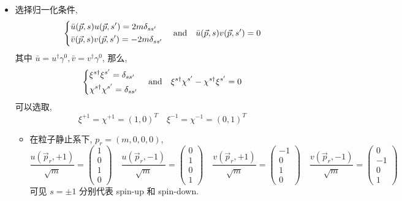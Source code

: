 \begin{itemize}
	\item 选择归一化条件,
	\begin{equation}
		\begin{dcases}
			\bar{u}(\vec{p}, s) u(\vec{p}, s') = 2 m \delta_{s s'} \\
			\bar{v}(\vec{p}, s) v(\vec{p}, s') = - 2 m \delta_{s s'}
		\end{dcases} \quad \text{and} \quad \bar{u}(\vec{p}, s) v(\vec{p}, s') = 0
	\end{equation}
	其中 $\bar{u} = u^\dag \gamma^0, \bar{v} = v^\dag \gamma^0$, 那么,
	\begin{equation}
		\begin{dcases}
			\xi^{s \dag} \xi^{s'} = \delta_{s s'} \\
			\chi^{s \dag} \chi^{s'} = \delta_{s s'}
		\end{dcases} \quad \text{and} \quad \xi^{s \dag} \chi^{s'} - \chi^{s \dag} \xi^{s'} = 0
	\end{equation}
	可以选取,
	\begin{equation}
		\xi^{+ 1} = \chi^{+ 1} = (1, 0)^T \quad \xi^{- 1} = \chi^{- 1} = (0, 1)^T
	\end{equation}
	\begin{itemize}
		\item 在粒子静止系下, $p_r = (m, 0, 0, 0)$,
		\begin{equation}
			\frac{u(\vec{p}_r, + 1)}{\sqrt{m}} = \begin{pmatrix}
				1 \\
				0 \\
				1 \\
				0
			\end{pmatrix} \quad \frac{u(\vec{p}_r, - 1)}{\sqrt{m}} = \begin{pmatrix}
				0 \\
				1 \\
				0 \\
				1
			\end{pmatrix} \quad \frac{v(\vec{p}_r, + 1)}{\sqrt{m}} = \begin{pmatrix}
				- 1 \\
				0 \\
				1 \\
				0
			\end{pmatrix} \quad \frac{v(\vec{p}_r, - 1)}{\sqrt{m}} = \begin{pmatrix}
				0 \\
				- 1 \\
				0 \\
				1
			\end{pmatrix}
		\end{equation}
		可见 $s = \pm 1$ 分别代表 spin-up 和 spin-down.
		

\end{itemize}
\end{itemize}
